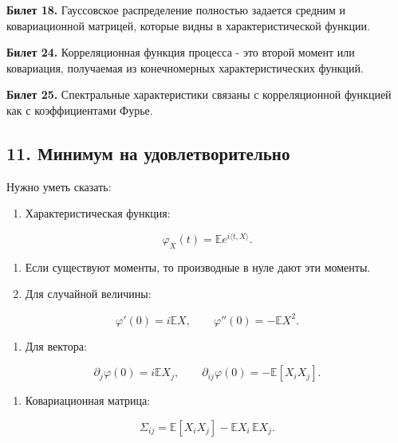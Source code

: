 \documentclass[
  11pt,
  a4paper,
]{article}
\providecommand{\tightlist}{%
  \setlength{\itemsep}{0pt}\setlength{\parskip}{0pt}}
\begin{document}
\textbf{Билет 18.} Гауссовское распределение полностью задается средним
и ковариационной матрицей, которые видны в характеристической функции.

\textbf{Билет 24.} Корреляционная функция процесса - это второй момент
или ковариация, получаемая из конечномерных характеристических функций.

\textbf{Билет 25.} Спектральные характеристики связаны с корреляционной
функцией как с коэффициентами Фурье.

\subsection{11. Минимум на
удовлетворительно}\label{ux43cux438ux43dux438ux43cux443ux43c-ux43dux430-ux443ux434ux43eux432ux43bux435ux442ux432ux43eux440ux438ux442ux435ux43bux44cux43dux43e}

Нужно уметь сказать:

\begin{enumerate}
\def\labelenumi{\arabic{enumi}.}
\tightlist
\item
  Характеристическая функция:
\end{enumerate}

\[
\varphi_X(t)=\mathbb E e^{i\langle t,X\rangle}.
\]

\begin{enumerate}
\def\labelenumi{\arabic{enumi}.}
\setcounter{enumi}{1}
\item
  Если существуют моменты, то производные в нуле дают эти моменты.
\item
  Для случайной величины:
\end{enumerate}

\[
\varphi'(0)=i\mathbb EX,
\qquad
\varphi''(0)=-\mathbb EX^2.
\]

\begin{enumerate}
\def\labelenumi{\arabic{enumi}.}
\setcounter{enumi}{3}
\tightlist
\item
  Для вектора:
\end{enumerate}

\[
\partial_j\varphi(0)=i\mathbb EX_j,
\qquad
\partial_{ij}\varphi(0)=-\mathbb E[X_iX_j].
\]

\begin{enumerate}
\def\labelenumi{\arabic{enumi}.}
\setcounter{enumi}{4}
\tightlist
\item
  Ковариационная матрица:
\end{enumerate}

\[
\Sigma_{ij}=\mathbb E[X_iX_j]-\mathbb EX_i\,\mathbb EX_j.
\]
\end{document}
